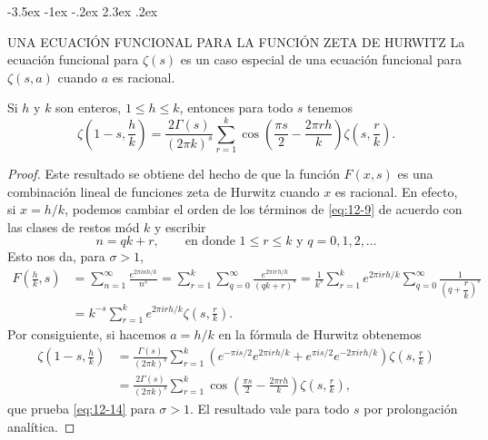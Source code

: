 \documentclass[12pt,a4paper]{book}
\makeatletter
\renewcommand\section{\@startsection{section}{1}{\z@}%
  {-3.5ex \@plus -1ex \@minus -.2ex}%
  {2.3ex \@plus .2ex}%
  {\normalfont\Large\bfseries\raggedright}}
\makeatother
\begin{document}
    \section{UNA ECUACIÓN FUNCIONAL PARA LA FUNCIÓN ZETA DE HURWITZ}
    La ecuación funcional para $\zeta(s)$ es un caso especial de una ecuación funcional para
    $\zeta(s,a)$ cuando $a$ es racional.

    \begin{teorema}\label{teo:12-8}
        Si $h$ y $k$ son enteros, $1\leq h\leq k$, entonces para todo $s$ tenemos
        \begin{equation}\label{eq:12-14}
            \zeta\left(1-s,\frac{h}{k}\right)=\frac{2\Gamma(s)}{(2\pi k)^{s}}\sum_{r=1}^{k}\cos\left(\frac{\pi s}{2}-\frac{2\pi rh}{k}\right)\zeta\left(s,\frac{r}{k}\right).
        \end{equation}
    \end{teorema}

    \begin{proof}
        Este resultado se obtiene del hecho de que la función $F(x,s)$ es una combinación
        lineal de funciones zeta de Hurwitz cuando $x$ es racional. En efecto, si $x=h/k$,
        podemos cambiar el orden de los términos de \eqref{eq:12-9} de acuerdo con las clases
        de restos mód $k$ y escribir
        \begin{equation*}
            n=qk+r,\qquad\text{en donde }1\leq r\leq k\text{ y }q=0,1,2,\dots
        \end{equation*}
        Esto nos da, para $\sigma>1$,
        \begin{align*}
            F\left(\frac{h}{k},s\right)&=\sum_{n=1}^{\infty}\frac{e^{2\pi inh/k}}{n^{s}}=\sum_{r=1}^{k}\sum_{q=0}^{\infty}\frac{e^{2\pi irh/k}}{(qk+r)^{s}}=\frac{1}{k^{s}}\sum_{r=1}^{k}e^{2\pi irh/k}\sum_{q=0}^{\infty}\frac{1}{\left(q+\dfrac{r}{k}\right)^{s}}\\
            &=k^{-s}\sum_{r=1}^{k}e^{2\pi irh/k}\zeta\left(s,\frac{r}{k}\right).
        \end{align*}
        Por consiguiente, si hacemos $a=h/k$ en la fórmula de Hurwitz obtenemos
        \begin{align*}
            \zeta\left(1-s,\frac{h}{k}\right)&=\frac{\Gamma(s)}{(2\pi k)^{s}}\sum_{r=1}^{k}\left(e^{-\pi is/2}e^{2\pi irh/k}+e^{\pi is/2}e^{-2\pi irh/k}\right)\zeta\left(s,\frac{r}{k}\right)\\
            &=\frac{2\Gamma(s)}{(2\pi k)^{s}}\sum_{r=1}^{k}\cos\left(\frac{\pi s}{2}-\frac{2\pi rh}{k}\right)\zeta\left(s,\frac{r}{k}\right),
        \end{align*}
        que prueba \eqref{eq:12-14} para $\sigma>1$. El resultado vale para todo $s$ por
        prolongación analítica.
    \end{proof}
\end{document}
